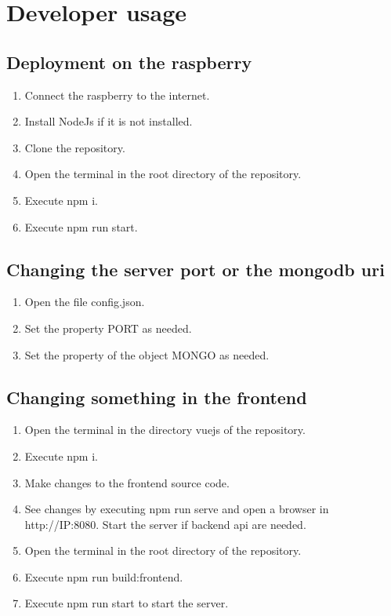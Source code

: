 \section{\huge{Developer usage}}

\subsection{Deployment on the raspberry}
\begin{enumerate}
    \item Connect the raspberry to the internet.
    \item Install NodeJs if it is not installed.
    \item Clone the repository.
    \item Open the terminal in the root directory of the repository.
    \item Execute npm i.
    \item Execute npm run start.
\end{enumerate}

\subsection{Changing the server port or the mongodb uri}
\begin{enumerate}
    \item Open the file config.json.
    \item Set the property PORT as needed.
    \item Set the property of the object MONGO as needed.
\end{enumerate}

\subsection{Changing something in the frontend}
\begin{enumerate}
    \item Open the terminal in the directory vuejs of the repository.
    \item Execute npm i.
    \item Make changes to the frontend source code.
    \item See changes by executing npm run serve and open a browser in http://IP:8080. Start the server if backend api are needed.
    \item Open the terminal in the root directory of the repository.
    \item Execute npm run build:frontend.
    \item Execute npm run start to start the server.
\end{enumerate}

